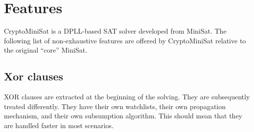 \documentclass[final]{ieee}
\begin{document}
% 
% 
\section{Features}
CryptoMiniSat is a DPLL-based SAT solver developed from MiniSat. The following list of non-exhaustive features are offered by CryptoMiniSat relative to the original ``core'' MiniSat.

\subsection{Xor clauses}
XOR clauses are extracted at the beginning of the solving. They are subsequently treated differently. They have their own watchlists, their own propagation mechanism, and their own subsumption algorithm. This should mean that they are handled faster in most scenarios.
\end{document}
